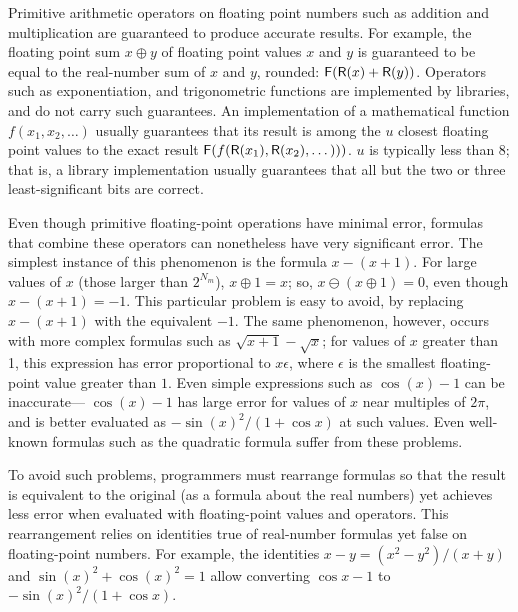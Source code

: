 \documentclass[paper.tex]{subfiles}
\begin{document}
Primitive arithmetic operators on floating point numbers
  such as addition and multiplication
  are guaranteed to produce accurate results.
For example, the floating point sum
  $x \oplus y$ of floating point values $x$ and $y$
  is guaranteed to be equal to the real-number sum
  of $x$ and $y$, rounded: $\mathsf{F}(\mathsf{R}(x) + \mathsf{R}(y))$.
Operators such as exponentiation, and trigonometric functions
  are implemented by libraries, and do not carry such guarantees.
An implementation of a mathematical function $f(x_1, x_2, \dotsc)$
  usually guarantees that its result
  is among the $u$ closest floating point values
  to the exact result $\mathsf{F}(f(\mathsf{R}(x_1), \mathsf{R}(x_2), \dotsc)))$.
$u$ is typically less than 8; that is,
  a library implementation usually guarantees that all
  but the two or three least-significant bits are correct.

\subtitle{Floating point precision problems}

Even though primitive floating-point operations have minimal error,
  formulas that combine these operators can nonetheless
  have very significant error.
The simplest instance of this phenomenon is the formula $x - (x + 1)$.
For large values of $x$ (those larger than $2^{N_m}$), $x \oplus 1 = x$;
  so, $x \ominus (x \oplus 1) = 0$, even though $x - (x + 1) = -1$.
This particular problem is easy to avoid, by replacing $x - (x + 1)$
  with the equivalent $-1$.
The same phenomenon, however, occurs with more complex formulas
  such as $\sqrt{x+1} - \sqrt{x}$;
  for values of $x$ greater than 1, this expression
  has error proportional to $x \epsilon$,
  where $\epsilon$ is the smallest floating-point value
  greater than $1$.
Even simple expressions such as $\cos(x) - 1$ can be inaccurate---%
  $\cos(x) - 1$ has large error for values of $x$ near multiples of $2\pi$,
  and is better evaluated as $-\sin(x)^2 / (1 + \cos x)$ at such values.
Even well-known formulas such as the quadratic formula
  suffer from these problems.

To avoid such problems, programmers must rearrange formulas
  so that the result is equivalent to the original
  (as a formula about the real numbers)
  yet achieves less error when evaluated
  with floating-point values and operators.
This rearrangement relies on identities
  true of real-number formulas yet false on floating-point numbers.
For example, the identities $x - y = (x^2 - y^2) / (x + y)$
  and $\sin(x)^2 + \cos(x)^2 = 1$
  allow converting $\cos x - 1$ to $- \sin(x)^2 / (1 + \cos x)$.
\end{document}
